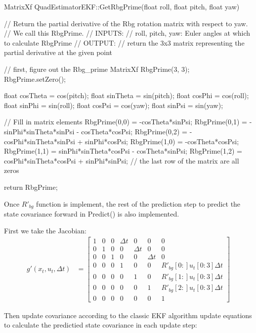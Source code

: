 \documentclass[letterpaper]{article}
\begin{document}
\begin{CPP}
MatrixXf QuadEstimatorEKF::GetRbgPrime(float roll, float pitch, float yaw)
{
    // Return the partial derivative of the Rbg rotation matrix with respect to yaw. 
    // We call this RbgPrime.
    // INPUTS: 
    //   roll, pitch, yaw: Euler angles at which to calculate RbgPrime
    // OUTPUT:
    //   return the 3x3 matrix representing the partial derivative at the given point

    // first, figure out the Rbg_prime
    MatrixXf RbgPrime(3, 3);
    RbgPrime.setZero();

    float cosTheta = cos(pitch);
    float sinTheta = sin(pitch);
    float cosPhi   = cos(roll);
    float sinPhi   = sin(roll);
    float cosPsi   = cos(yaw);
    float sinPsi   = sin(yaw);

    // Fill in matrix elements
    RbgPrime(0,0)  = -cosTheta*sinPsi;
    RbgPrime(0,1)  = -sinPhi*sinTheta*sinPsi - cosTheta*cosPsi;
    RbgPrime(0,2)  = -cosPhi*sinTheta*sinPsi + sinPhi*cosPsi;
    RbgPrime(1,0)  = -cosTheta*cosPsi;
    RbgPrime(1,1)  = sinPhi*sinTheta*cosPsi - cosTheta*sinPsi;
    RbgPrime(1,2)  = cosPhi*sinTheta*cosPsi + sinPhi*sinPsi;
    // the last row of the matrix are all zeros

    return RbgPrime;
}
\end{CPP}

Once $R'_{bg}$ function is implement, the rest of the prediction step to predict the state covariance forward in Predict() is also implemented.

First we take the Jacobian:
\begin{align}
  g'(x_t, u_t, \Delta t) &= 
      \left [ \begin{array}{ccccccc}
      1 & 0 & 0 & \Delta t & 0 & 0 & 0\\
      0 & 1 & 0 & 0 & \Delta t & 0 & 0\\
      0 & 0 & 1 & 0 & 0 & \Delta t & 0\\
      0 & 0 & 0 & 1 & 0 & 0 & R'_{bg}[0:]u_t[0:3] \Delta t\\
      0 & 0 & 0 & 0 & 1 & 0 & R'_{bg}[1:]u_t[0:3] \Delta t\\
      0 & 0 & 0 & 0 & 0 & 1 & R'_{bg}[2:]u_t[0:3] \Delta t\\
      0 & 0 & 0 & 0 & 0 & 0 & 1
    \end{array}
    \right]
\end{align}

Then update covariance according to the classic EKF algorithm update equations to calculate the predictied state covariance in each update step:
\end{document}
